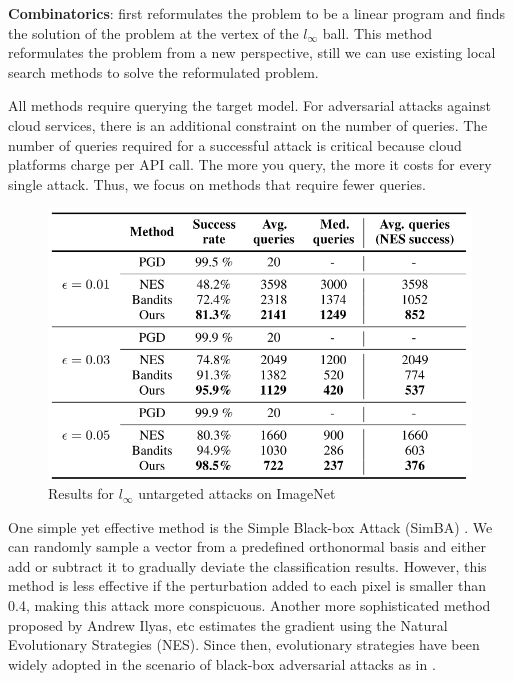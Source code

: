 \textbf{Combinatorics}: \cite{moon2019parsimonious} first reformulates the problem to be a linear program and finds the solution of the problem at the vertex of the $l_\infty$ ball. This method reformulates the problem from a new perspective, still we can  use existing local search methods to solve the reformulated problem.

All methods require querying the target model. For adversarial attacks against cloud services, there is an additional constraint on the number of queries. The number of queries required for a successful attack is critical because cloud platforms charge per API call. The more you query, the more it costs for every single attack. Thus, we focus on methods that require fewer queries.

\begin{figure}[H]
\centering
\includegraphics[scale=0.65]{figures/chapter_classification/parsimounious.png}
\caption{Results for $l_{\infty}$ untargeted attacks on ImageNet \cite{moon2019parsimonious}}
\label{fig.parsi}
\end{figure}

One simple yet effective method is the Simple Black-box Attack (SimBA) \cite{guo2019simple}. We can randomly sample a vector from a predefined orthonormal basis and either add or subtract it to gradually deviate the classification results. However, this method is less effective if the perturbation added to each pixel is smaller than 0.4, making this attack more conspicuous. Another more sophisticated method proposed by Andrew Ilyas, etc \cite{ilyas2018black} estimates the gradient using the Natural Evolutionary Strategies (NES). Since then, evolutionary strategies have been widely adopted in the scenario of black-box adversarial attacks as in \cite{meunier2019yet} \cite{Ilie2021}.

